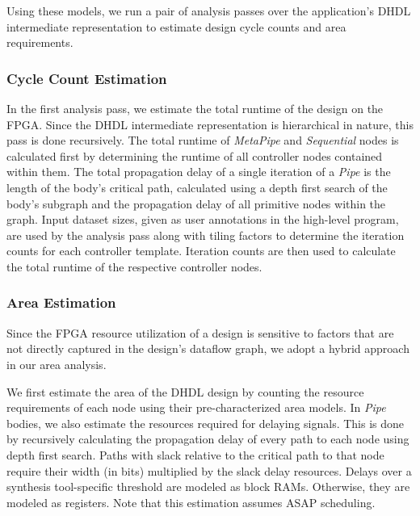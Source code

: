Using these models, we run a pair of analysis passes over the application's DHDL intermediate representation to estimate design cycle counts and area requirements.

\subsubsection{Cycle Count Estimation}
In the first analysis pass, we estimate the total runtime of the design on the FPGA.
Since the DHDL intermediate representation is hierarchical in nature, this pass is done recursively.
The total runtime of \emph{MetaPipe} and \emph{Sequential} nodes is calculated first by determining
the runtime of all controller nodes contained within them. The total propagation delay of a single
iteration of a \emph{Pipe} is the length of the body's critical path, calculated using a depth first
search of the body's subgraph and the propagation delay of all primitive nodes within the graph.
Input dataset sizes, given as user annotations in the high-level program, are used by the analysis pass
along with tiling factors to determine the iteration counts for each controller template.
Iteration counts are then used to calculate the total runtime of the respective controller nodes. %


\subsubsection{Area Estimation}
Since the FPGA resource utilization of a design is sensitive to factors that are not directly captured
in the design's dataflow graph, we adopt a hybrid approach in our area analysis.

We first estimate the area of the DHDL design by counting the resource
requirements of each node using their pre-characterized area models. In \emph{Pipe} bodies, we also
estimate the resources required for delaying signals. This is done by recursively calculating the
propagation delay of every path to each node using depth first search. Paths with slack relative to
the critical path to that node require their width (in bits) multiplied by the slack delay resources.
Delays over a synthesis tool-specific threshold are modeled as block RAMs.
Otherwise, they are modeled as registers. Note that this estimation assumes ASAP scheduling.

